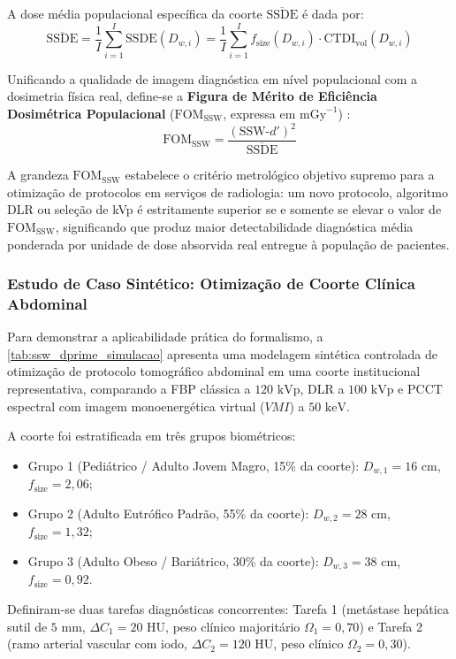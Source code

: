 \documentclass[
  12pt,
  a4paper,
  oneside
]{report}
\begin{document}
A dose média populacional específica da coorte $\overline{\text{SSDE}}$ é dada por:
\begin{equation}
  \overline{\text{SSDE}} = \frac{1}{I} \sum_{i=1}^I \text{SSDE}(D_{w,i}) = \frac{1}{I} \sum_{i=1}^I f_{\text{size}}(D_{w,i}) \cdot \text{CTDI}_{\text{vol}}(D_{w,i})
  \label{eq:ssde_medio_coorte}
\end{equation}

Unificando a qualidade de imagem diagnóstica em nível populacional com a dosimetria física real, define-se a \textbf{Figura de Mérito de Eficiência Dosimétrica Populacional} ($\text{FOM}_{\text{SSW}}$, expressa em $\text{mGy}^{-1}$) \cite{fitton2026}:
\begin{equation}
  \text{FOM}_{\text{SSW}} = \frac{(\text{SSW-}d')^2}{\overline{\text{SSDE}}}
  \label{eq:fom_ssw_formula}
\end{equation}

A grandeza $\text{FOM}_{\text{SSW}}$ estabelece o critério metrológico objetivo supremo para a otimização de protocolos em serviços de radiologia: um novo protocolo, algoritmo DLR ou seleção de kVp é estritamente superior se e somente se elevar o valor de $\text{FOM}_{\text{SSW}}$, significando que produz maior detectabilidade diagnóstica média ponderada por unidade de dose absorvida real entregue à população de pacientes.

\subsubsection{Estudo de Caso Sintético: Otimização de Coorte Clínica Abdominal}
Para demonstrar a aplicabilidade prática do formalismo, a \cref{tab:ssw_dprime_simulacao} apresenta uma modelagem sintética controlada de otimização de protocolo tomográfico abdominal em uma coorte institucional representativa, comparando a FBP clássica a $120\text{ kVp}$, DLR a $100\text{ kVp}$ e PCCT espectral com imagem monoenergética virtual ($VMI$) a $50\text{ keV}$.

A coorte foi estratificada em três grupos biométricos:
\begin{itemize}
  \item Grupo 1 (Pediátrico / Adulto Jovem Magro, 15\% da coorte): $D_{w,1} = 16\text{ cm}$, $f_{\text{size}} = 2{,}06$;
  \item Grupo 2 (Adulto Eutrófico Padrão, 55\% da coorte): $D_{w,2} = 28\text{ cm}$, $f_{\text{size}} = 1{,}32$;
  \item Grupo 3 (Adulto Obeso / Bariátrico, 30\% da coorte): $D_{w,3} = 38\text{ cm}$, $f_{\text{size}} = 0{,}92$.
\end{itemize}
Definiram-se duas tarefas diagnósticas concorrentes: Tarefa 1 (metástase hepática sutil de $5\text{ mm}$, $\Delta C_1 = 20\text{ HU}$, peso clínico majoritário $\Omega_1 = 0{,}70$) e Tarefa 2 (ramo arterial vascular com iodo, $\Delta C_2 = 120\text{ HU}$, peso clínico $\Omega_2 = 0{,}30$).
\end{document}
